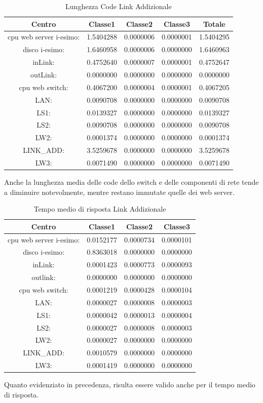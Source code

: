 \begin{table}[H]
\begin{center}
\begin{tabular}{||c|c|c|c|c||}
\hline
Centro &Classe1 &Classe2 &Classe3 &Totale\\
\hline
\hline
 cpu web server i-esimo: 	&1.5404288	&0.0000006	&0.0000001	&1.5404295\\
\hline
 disco i-esimo: 	&1.6460958	&0.0000006	&0.0000000	&1.6460963\\
\hline
 inLink: 	&0.4752640	&0.0000007	&0.0000001	&0.4752647\\
\hline
 outLink: 	&0.0000000	&0.0000000	&0.0000000	&0.0000000\\
\hline
 cpu web switch: 	&0.4067200	&0.0000004	&0.0000001	&0.4067205\\
\hline
 LAN: 	&0.0090708	&0.0000000	&0.0000000	&0.0090708\\
\hline
 LS1: 	&0.0139327	&0.0000000	&0.0000000	&0.0139327\\
\hline
 LS2: 	&0.0090708	&0.0000000	&0.0000000	&0.0090708\\
\hline
 LW2: 	&0.0001374	&0.0000000	&0.0000000	&0.0001374\\
\hline
 LINK\_ADD: 	&3.5259678	&0.0000000	&0.0000000	&3.5259678\\
\hline
 LW3: 	&0.0071490	&0.0000000	&0.0000000	&0.0071490\\
\hline
\end{tabular}
\end{center}
\caption{Lunghezza Code Link Addizionale}
\label{lunghezzacode}
\end{table}
Anche la lunghezza media delle code dello switch e delle componenti di rete tende a diminuire notevolmente, mentre restano immutate quelle dei web server.
\begin{table}[H]
\begin{center}
\begin{tabular}{||c|c|c|c||}
\hline
Centro &Classe1 &Classe2 &Classe3\\
\hline
\hline
 cpu web server i-esimo: 	&0.0152177	&0.0000734	&0.0000101\\
\hline
 disco i-esimo: 	&0.8363018	&0.0000000	&0.0000000\\
\hline
 inLink: 	&0.0001423	&0.0000773	&0.0000093\\
\hline
 outlink: 	&0.0000000	&0.0000000	&0.0000000\\
\hline
 cpu web switch: 	&0.0001219	&0.0000428	&0.0000104\\
\hline
 LAN: 	&0.0000027	&0.0000008	&0.0000003\\
\hline
 LS1: 	&0.0000042	&0.0000013	&0.0000004\\
\hline
 LS2: 	&0.0000027	&0.0000008	&0.0000003\\
\hline
 LW2: 	&0.0000027	&0.0000000	&0.0000000\\
\hline
 LINK\_ADD: 	&0.0010579	&0.0000000	&0.0000000\\
\hline
 LW3: 	&0.0001419	&0.0000000	&0.0000000\\
\hline
\end{tabular}
\end{center}
\caption{Tempo medio di risposta Link Addizionale}
\label{tempomediodirisposta}
\end{table}
Quanto evidenziato in precedenza, risulta essere valido anche per il tempo medio di risposta.
